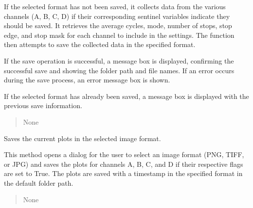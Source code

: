 \documentclass[letterpaper,10pt,english]{sphinxmanual}
\begin{document}
\begin{fulllineitems}
\begin{fulllineitems}
\sphinxAtStartPar
If the selected format has not been saved, it collects data from the various 
channels (A, B, C, D) if their corresponding sentinel variables indicate 
they should be saved. It retrieves the average cycles, mode, number of stops, 
stop edge, and stop mask for each channel to include in the settings. The 
function then attempts to save the collected data in the specified format.

\sphinxAtStartPar
If the save operation is successful, a message box is displayed, confirming 
the successful save and showing the folder path and file names. If an error 
occurs during the save process, an error message box is shown.

\sphinxAtStartPar
If the selected format has already been saved, a message box is displayed 
with the previous save information.
\begin{quote}\begin{description}
\sphinxAtStartPar
None

\end{description}\end{quote}

\end{fulllineitems}


\begin{fulllineitems}
\label{\detokenize{StartStopHist:StartStopHist.StartStopLogic.save_plots}}
\pysigstartsignatures
{}
\pysigstopsignatures
\sphinxAtStartPar
Saves the current plots in the selected image format.

\sphinxAtStartPar
This method opens a dialog for the user to select an image format (PNG, TIFF, or JPG) 
and saves the plots for channels A, B, C, and D if their respective flags are set to True. 
The plots are saved with a timestamp in the specified format in the default folder path.
\begin{quote}\begin{description}
\sphinxAtStartPar
None

\end{description}\end{quote}

\end{fulllineitems}



\end{fulllineitems}
\end{document}
